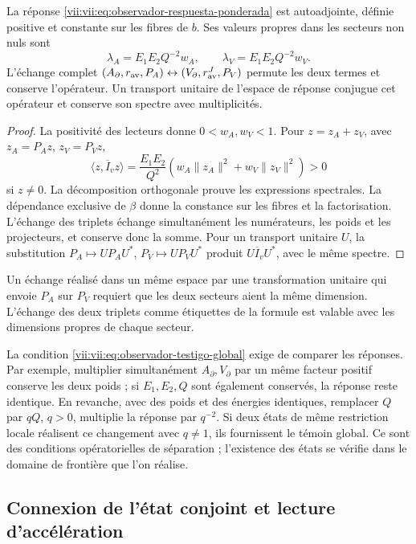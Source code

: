 \begin{proposition}
\label{vii:vii:prop:observador-respuesta-positiva}
La réponse \eqref{vii:vii:eq:observador-respuesta-ponderada} est
autoadjointe, définie positive et constante sur les fibres de \(b\).
Ses valeurs propres dans les secteurs non nuls sont
\[
 \lambda_A=E_1E_2Q^{-2}w_A,\qquad
 \lambda_V=E_1E_2Q^{-2}w_V.
\]
L'échange complet \((A_\partial,r_{\rm av},P_A)
 \leftrightarrow(V_\partial,r_{\rm av}^{J},P_V)\) permute les deux termes et conserve l'opérateur. Un transport unitaire de l'espace de réponse conjugue cet opérateur et conserve son spectre avec multiplicités.
\end{proposition}

\begin{proof}
La positivité des lecteurs donne \(0<w_A,w_V<1\). Pour
\(z=z_A+z_V\), avec \(z_A=P_Az\), \(z_V=P_Vz\),
\[
 \langle z,\overline I_vz\rangle
 =\frac{E_1E_2}{Q^2}
   (w_A\|z_A\|^2+w_V\|z_V\|^2)>0
\]
si \(z\neq0\). La décomposition orthogonale prouve les expressions
spectrales. La dépendance exclusive de \(\beta\) donne la constance
sur les fibres et la factorisation. L'échange des triplets
échange simultanément les numérateurs, les poids et les projecteurs, et
conserve donc la somme. Pour un transport unitaire \(U\), la substitution
\(P_A\mapsto UP_AU^*\), \(P_V\mapsto UP_VU^*\) produit
\(U\overline I_vU^*\), avec le même spectre.
\end{proof}

Un échange réalisé dans un même espace par une transformation unitaire
qui envoie \(P_A\) sur \(P_V\) requiert que les deux secteurs aient
la même dimension. L'échange des deux triplets comme étiquettes de la
formule est valable avec les dimensions propres de chaque secteur.

La condition \eqref{vii:vii:eq:observador-testigo-global} exige de comparer les réponses. Par exemple, multiplier simultanément \(A_\partial,V_\partial\) par un même facteur positif conserve les deux poids ; si \(E_1,E_2,Q\) sont également conservés, la réponse reste identique. En revanche, avec des poids et des énergies identiques, remplacer \(Q\) par \(qQ\), \(q>0\), multiplie la réponse par \(q^{-2}\). Si deux états de même restriction locale réalisent ce changement avec \(q\neq1\), ils fournissent le témoin global. Ce sont des conditions opératorielles de séparation ; l'existence des états se vérifie dans le domaine de frontière que l'on réalise.

\subsection{Connexion de l'état conjoint et lecture d'accélération}
\label{vii:vii:sec:observador-autoinercia}

